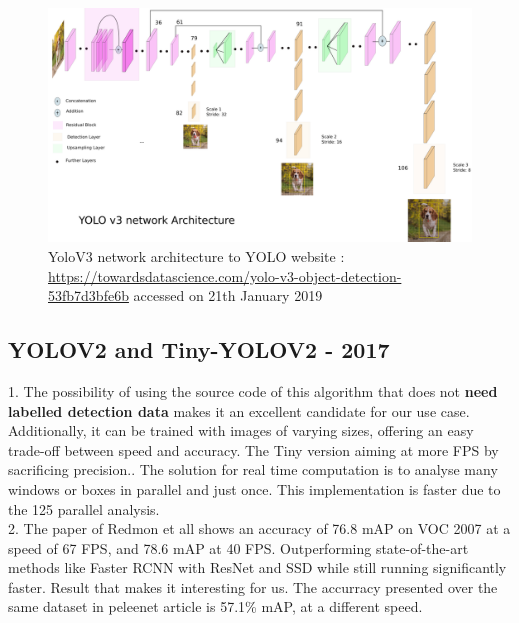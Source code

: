 \documentclass[10pt]{article}
\begin{document}
\begin{figure}[H]
  	\centering
    \includegraphics[scale=0.4]{yolov3.PNG}
    \caption{YoloV3 network architecture to YOLO website : \url{https://towardsdatascience.com/yolo-v3-object-detection-53fb7d3bfe6b} accessed on 21th January 2019}
\end{figure}



\subsection{YOLOV2 and Tiny-YOLOV2 - 2017}

1. The possibility of using the source code of this algorithm that does not \textbf{need labelled detection data} makes it an excellent candidate for our use case. Additionally, it can be trained with images of varying sizes, offering an easy trade-off between speed and accuracy. The Tiny version aiming at more FPS by sacrificing precision.\cite{redmon2017yolo9000}. The solution for real time computation is to analyse many windows or boxes in parallel and just once. This implementation is faster due to the 125 parallel analysis.\\

2.
The paper of Redmon et all \cite{redmon2017yolo9000} shows an accuracy of 76.8 mAP on VOC 2007 at a speed of 67 FPS, and 78.6 mAP at 40 FPS. Outperforming state-of-the-art methods like Faster RCNN with ResNet and SSD while still running significantly faster. Result that makes it interesting for us.
The accurracy presented over the same dataset in peleenet article \cite{wang2018pelee} is 57.1\% mAP, at a different speed.
\end{document}
